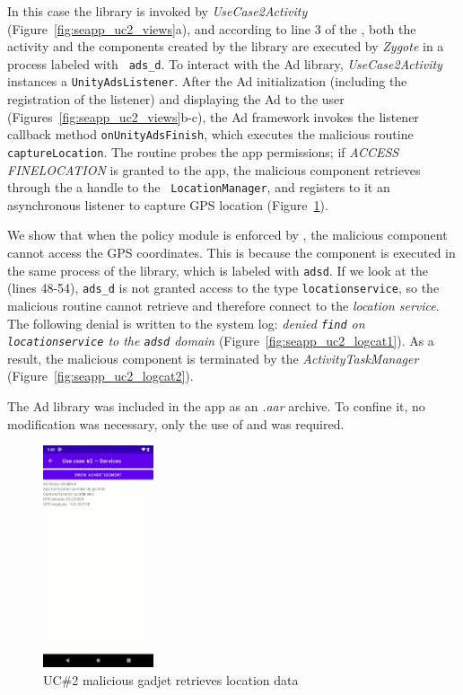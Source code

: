 In this case the library is invoked by {\em UseCase2Activity}
(Figure~\ref{fig:seapp_uc2_views}a), and according to line 3 of the
\seappcontexts, both the activity and the components created by the
library are executed by {\em Zygote} in a process labeled with {\tt
  ads\_d}.  To interact with the Ad library, {\em UseCase2Activity}
instances a {\tt UnityAdsListener}.  After the Ad initialization
(including the registration of the listener) and displaying the Ad to
the user (Figures~\ref{fig:seapp_uc2_views}b-c), the Ad framework
invokes the listener callback method {\tt onUnityAdsFinish}, which
executes the malicious routine {\tt captureLocation}. The routine
probes the app permissions; if {\em ACCESS\textunderscore
  FINE\textunderscore LOCATION} is granted to the app, the malicious
component retrieves through the \servicemanager a handle to the {\tt
  LocationManager}, and registers to it an asynchronous listener to
capture GPS location (Figure~\ref{fig:seapp_uc2_exploit}).

We show that when the policy module is enforced by \seapp, the malicious
component cannot access the GPS coordinates. This is because the
component is executed in the same process of the library, which is
labeled with {\tt ads\textunderscore d}. If we look at the \sepolicy
(lines 48-54), {\tt ads\_d} is not granted access to the \sel type
{\tt location\textunderscore service}, so the malicious routine cannot
retrieve and therefore connect to the {\em location\textunderscore
  service}.  The following denial is written to the system log: {\em
  denied {\tt find} on {\tt location\textunderscore service} to the
  {\tt ads\textunderscore d} domain}
(Figure~\ref{fig:seapp_uc2_logcat1}). As a result, the malicious
component is terminated by the {\em ActivityTaskManager}
(Figure~\ref{fig:seapp_uc2_logcat2}).

The Ad library was included in the app as an {\em .aar}
archive. To confine it, no modification was necessary, only
the use of \manifest and \sepolicy was required.

\begin{figure}[h]
  \centering
\includegraphics[width=0.29\textwidth]{chapters/seapp/figs/ae/uc24.png}
  \caption{\label{fig:seapp_uc2_exploit} UC\#2 malicious gadjet retrieves location data}
\end{figure}  

